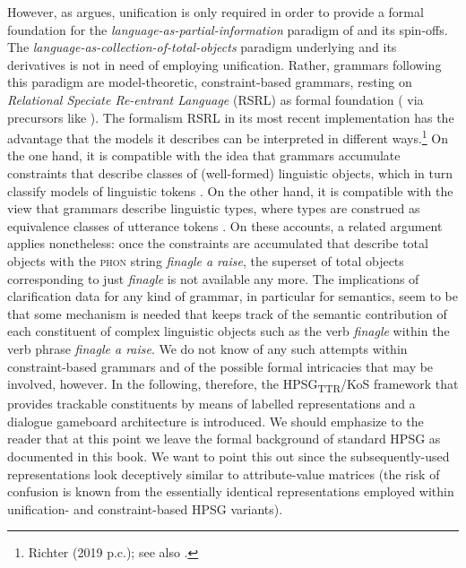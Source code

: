 \documentclass[output=paper,biblatex,babelshorthands,newtxmath,draftmode,colorlinks,citecolor=brown]{langscibook}
\begin{document}
\largerpage\enlargethispage{6pt}
However, as \citet[Chapter~2]{Richter:2000} argues, unification is only required in order to provide a formal foundation for the \textit{language-as-partial-information} paradigm of \citet{Pollard:Sag:1987} and its spin-offs. 
%
The \textit{language-as-collection-of-total-objects} paradigm underlying \citet{Pollard:Sag:1994} and its derivatives is not in need of employing unification.
%
Rather, grammars following this paradigm are model-theoretic, constraint-based grammars, resting on \emph{Relational Speciate Re-entrant Language} (RSRL) as formal foundation (\citealt{Richter:2000} via precursors like \citealt{King:1999}). %
%
The formalism RSRL in its most recent implementation \citep{Richter:2004} has the advantage that the models it describes can be interpreted in different ways.\footnote{Richter (2019 p.c.); see also .}
%
On the one hand, it is compatible with the idea that grammars accumulate constraints that describe classes of (well-formed) linguistic objects, which in turn classify models of linguistic tokens
\citep{King:1999}.
%
On the other hand, it is compatible with the view that grammars describe linguistic types, where types are construed as equivalence classes of utterance tokens \citep{Pollard:1999}.
%
On these accounts, a related argument applies nonetheless: once the constraints are accumulated that describe total objects with the \textsc{phon} string \textit{finagle a raise}, the superset of total objects corresponding to just \textit{finagle} is not available any more.
%
The implications of clarification data for any kind of grammar, in particular for semantics, seem to be that some mechanism is needed that keeps track of the semantic contribution of each constituent of complex linguistic objects such as the verb \textit{finagle} within the verb phrase \textit{finagle a raise}.
%
We do not know of any such attempts within constraint-based grammars and of the possible formal intricacies that may be involved, however.
%
In the following, therefore, the HPSG\textsubscript{TTR}/KoS framework that provides trackable constituents by means of labelled representations and a dialogue gameboard architecture is introduced.
%
We should emphasize to the reader that at this point we leave the formal background of standard HPSG as documented in this book.
%
We want to point this out since the subsequently-used representations look deceptively similar to attribute-value matrices (the risk of confusion is known from the essentially identical representations employed within unification- and constraint-based HPSG variants).
\end{document}
